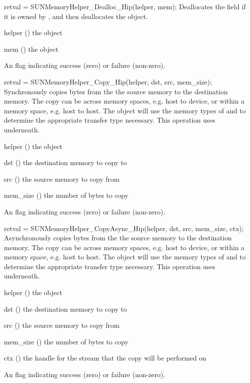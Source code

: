 {
  retval = SUNMemoryHelper\_Dealloc\_Hip(helper, mem);
}
{
  Deallocates the  field if it is owned by , and then
  deallocates the  object.
}
{
  \begin{args}[helper]
  \item[helper] () the  object
  \item[mem] () the  object
  \end{args}
}
{
  An  flag indicating success (zero) or failure (non-zero).
}
{}

{
  retval = SUNMemoryHelper\_Copy\_Hip(helper, dst, src, mem\_size);
}
{
  Synchronously copies  bytes from the the source memory to the
  destination memory.  The copy can be across memory spaces, e.g. host to
  device, or within a memory space, e.g. host to host. The 
  object will use the memory types of  and  to determine
  the appropriate transfer type necessary.
}
{
  This operation uses  underneath.
}
{
  \begin{args}
  \item[helper] () the  object
  \item[dst] () the destination memory to copy to
  \item[src] () the source memory to copy from
  \item[mem\_size] () the number of bytes to copy
  \end{args}
}
{
  An  flag indicating success (zero) or failure (non-zero).
}
{}

{
  retval = SUNMemoryHelper\_CopyAsync\_Hip(helper, dst, src, mem\_size, ctx);
}
{
  Asynchronously copies  bytes from the the source memory to the
  destination memory.  The copy can be across memory spaces, e.g. host to
  device, or within a memory space, e.g. host to host. The 
  object will use the memory types of  and  to determine
  the appropriate transfer type necessary.
}
{
  This operation uses  underneath.
}
{
  \begin{args}
  \item[helper] () the  object
  \item[dst] () the destination memory to copy to
  \item[src] () the source memory to copy from
  \item[mem\_size] () the number of bytes to copy
  \item[ctx] () the  handle for the stream that the copy
  will be performed on
  \end{args}
}
{
  An  flag indicating success (zero) or failure (non-zero).
}
{}
